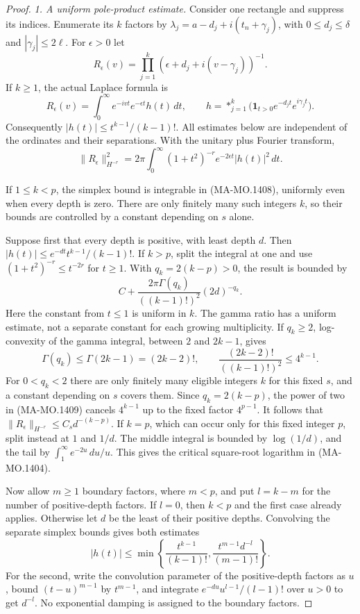 \begin{proof}
\emph{1. A uniform pole-product estimate.}
Consider one rectangle and suppress its indices.  Enumerate
its $k$ factors by
$\lambda_j=a-d_j+i(t_n+\gamma_j)$, with
$0\le d_j\le\delta$ and $|\gamma_j|\le2\ell$.
For $\epsilon>0$ let
\[
 R_\epsilon(v)=\prod_{j=1}^k
                  (\epsilon+d_j+i(v-\gamma_j))^{-1}.
 \tag{MA-MO.1406}
\]
If $k\ge1$, the actual Laplace formula is
\[
 R_\epsilon(v)=\int_0^\infty e^{-ivt}e^{-\epsilon t}h(t)\,dt,
 \qquad
 h=\mathop{*}_{j=1}^k
       \bigl(\mathbf1_{t>0}e^{-d_jt}e^{i\gamma_jt}\bigr).
 \tag{MA-MO.1407}
\]
Consequently
$|h(t)|\le t^{k-1}/(k-1)!$.  All estimates below are
independent of the ordinates and their separations.
With the unitary plus Fourier transform,
\[
 \|R_\epsilon\|_{H^{-r}}^2
       =2\pi\int_0^\infty
           (1+t^2)^{-r}e^{-2\epsilon t}|h(t)|^2\,dt.
 \tag{MA-MO.1408}
\]

If $1\le k<p$, the simplex bound is integrable in (MA-MO.1408),
uniformly even when every depth is zero.  There are only finitely
many such integers $k$, so their bounds are controlled by a
constant depending on $s$ alone.

Suppose first that every depth is positive, with least depth $d$.
Then $|h(t)|\le e^{-dt}t^{k-1}/(k-1)!$.
If $k>p$, split the integral at one and use
$(1+t^2)^{-r}\le t^{-2r}$ for $t\ge1$.  With
$q_k=2(k-p)>0$, the result is bounded by
\[
 C+\frac{2\pi\Gamma(q_k)}{((k-1)!)^2}
                                      (2d)^{-q_k}.
 \tag{MA-MO.1409}
\]
Here the constant from $t\le1$ is uniform in $k$.
The gamma ratio has a uniform estimate, not a separate
constant for each growing multiplicity.  If $q_k\ge2$,
log-convexity of the gamma integral, between $2$ and
$2k-1$, gives
\[
 \Gamma(q_k)\le\Gamma(2k-1)=(2k-2)!,\qquad
 \frac{(2k-2)!}{((k-1)!)^2}\le4^{k-1}.
 \tag{MA-MO.1410}
\]
For $0<q_k<2$ there are only finitely many eligible integers
$k$ for this fixed $s$, and a constant depending on $s$ covers
them.  Since $q_k=2(k-p)$, the power of two in (MA-MO.1409)
cancels $4^{k-1}$ up to the fixed factor $4^{p-1}$.
It follows that $\|R_\epsilon\|_{H^{-r}}\le C_s d^{-(k-p)}$.
If $k=p$, which can occur only for this fixed integer $p$,
split instead at $1$ and $1/d$.  The middle integral is
bounded by $\log(1/d)$, and the tail by
$\int_1^\infty e^{-2u}\,du/u$.  This gives the critical
square-root logarithm in (MA-MO.1404).

Now allow $m\ge1$ boundary factors, where $m<p$, and put
$l=k-m$ for the number of positive-depth factors.
If $l=0$, then $k<p$ and the first case already applies.
Otherwise let $d$ be the least of their positive depths.
Convolving the separate simplex bounds gives both estimates
\[
 |h(t)|\le
 \min\left\{\frac{t^{k-1}}{(k-1)!},
             \frac{t^{m-1}d^{-l}}{(m-1)!}\right\}.
 \tag{MA-MO.1411}
\]
For the second, write the convolution parameter of the
positive-depth factors as $u$, bound $(t-u)^{m-1}$ by
$t^{m-1}$, and integrate
$e^{-du}u^{l-1}/(l-1)!$ over $u>0$ to get $d^{-l}$.
No exponential damping is assigned to the boundary factors.


\end{proof}
